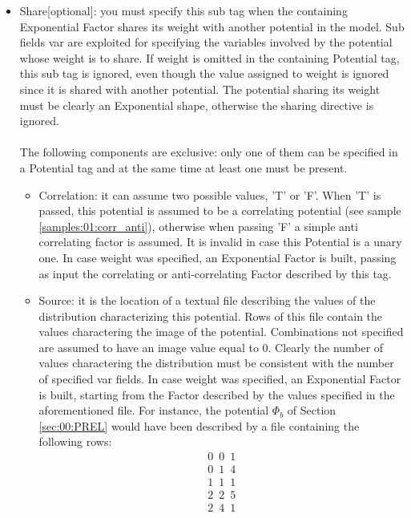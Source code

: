 \begin{itemize}
\begin{itemize}
\end{itemize}
\item Share[optional]: you must specify this sub tag when the containing Exponential Factor shares its weight with another potential in the model. 
Sub fields var are exploited for specifying the variables involved by the potential whose weight is to share. If weight is omitted in the containing Potential tag, this sub tag is ignored, even though the value assigned to weight is ignored since it is shared with another potential.
The potential sharing its weight must be clearly an Exponential shape, otherwise the sharing directive is ignored.
\\
\\
The following components are exclusive: only one of them can be specified in a Potential tag and at the same time at least one must be present.
\begin{itemize}
\item Correlation: it can assume two possible values, 'T' or 'F'. When 'T' is passed, this potential is assumed to be a correlating potential (see sample \ref{samples:01:corr_anti}), otherwise when passing 'F' a simple anti correlating factor is assumed.
It is invalid in case this Potential is a unary one.
In case weight was specified, an Exponential Factor is built, passing as input the correlating or anti-correlating Factor described by this tag.
\item Source: it is the location of a textual file describing the values of the distribution characterizing this potential.
Rows of this file contain the values charactering the image of the potential. 
Combinations not specified are assumed to have an image value equal to 0.
Clearly the number of values charactering the distribution must be consistent with the number of specified var fields.
In case weight was specified, an Exponential Factor is built, starting from the Factor described by the values specified in the aforementioned file.
For instance, the potential $\Phi _b$ of Section \ref{sec:00:PREL} would have been described by a file containing the following rows:
\begin{eqnarray}
0 \,\,\, 0 \,\,\, 1 \nonumber\\
0 \,\,\, 1 \,\,\, 4 \nonumber\\
1  \,\,\,1  \,\,\,1 \nonumber\\
2  \,\,\,2  \,\,\,5 \nonumber\\
2  \,\,\,4  \,\,\,1 \nonumber\\
\label{eq:00:XML_struct:shape_txt}
\end{eqnarray}

\end{itemize}
\end{itemize}
